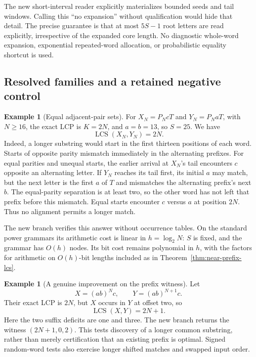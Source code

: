 \documentclass[11pt]{article}
\theoremstyle{definition}
\newtheorem{example}[theorem]{Example}
\theoremstyle{remark}
\newcommand{\LCS}{\operatorname{LCS}}
\begin{document}
The new short-interval reader explicitly materializes bounded seeds and
tail windows. Calling this ``no expansion'' without qualification would
hide that detail. The precise guarantee is that at most $5S-1$ root
letters are read explicitly, irrespective of the expanded core length.
No diagnostic whole-word expansion, exponential repeated-word allocation,
or probabilistic equality shortcut is used.

\subsection{Resolved families and a retained negative control}

\begin{example}[Equal adjacent-pair sets]
For $X_N=P_NcT$ and $Y_N=P_NaT$, with $N\ge16$, the exact LCP is
$K=2N$, and $a=b=13$, so $S=25$. We have
\[
 \LCS(X_N,Y_N)=2N.
\]
Indeed, a longer substring would start in the first thirteen positions
of each word. Starts of opposite parity mismatch immediately in the
alternating prefixes. For equal parities and unequal starts, the earlier
arrival at $X_N$'s tail encounters $c$ opposite an alternating letter.
If $Y_N$ reaches its tail first, its initial $a$ may match, but the next
letter is the first $a$ of $T$ and mismatches the alternating prefix's
next $b$. The equal-parity separation is at least two, so the other
word has not left that prefix before this mismatch. Equal starts
encounter $c$ versus $a$ at position $2N$. Thus no alignment permits a
longer match.

The new branch verifies this answer without occurrence tables. On the
standard power grammars its arithmetic cost is linear in
$h=\log_2N$: $S$ is fixed, and the grammar has $O(h)$ nodes. Its bit
cost remains polynomial in $h$, with the factors for arithmetic on
$O(h)$-bit lengths included as in Theorem~\ref{thm:near-prefix-lcs}.
\end{example}

\begin{example}[A genuine improvement on the prefix witness]
Let
\[
 X=(ab)^Nc,\qquad Y=(ab)^{N+1}c.
\]
Their exact LCP is $2N$, but $X$ occurs in $Y$ at offset two, so
\[
 \LCS(X,Y)=2N+1.
\]
Here the two suffix deficits are one and three. The new branch returns
the witness $(2N+1,0,2)$. This tests discovery of a longer common
substring, rather than merely certification that an existing prefix is
optimal. Signed random-word tests also exercise longer shifted matches
and swapped input order.
\end{example}
\end{document}
